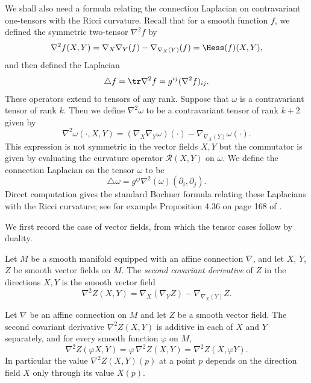 We shall also need a formula relating the connection Laplacian on
contravariant one-tensors with the Ricci curvature. Recall that for
a smooth function $f$, we defined the symmetric two-tensor
$\nabla^2f$ by
$$\nabla^2f(X,Y)=\nabla_X\nabla_Y(f)-\nabla_{\nabla_X(Y)}(f)=\Hess(f)(X,Y),$$
and then defined the Laplacian
$$\triangle f=\tr\nabla^2f=g^{ij}(\nabla^2f)_{ij}.$$ These operators extend to tensors of any
rank. Suppose that $\omega$ is a contravariant tensor of rank $k$. Then we
define $\nabla^2\omega$ to be a contravariant tensor of rank $k+2$ given by
$$\nabla^2\omega(\cdot,X,Y)=(\nabla_{X}\nabla_{Y}\omega)(\cdot)
-\nabla_{\nabla_X(Y)}\omega(\cdot).$$ This expression is not
symmetric in the vector fields $X,Y$ but the commutator is given by
evaluating the curvature operator ${\mathcal R}(X,Y)$ on $\omega$.
We define the connection Laplacian on the tensor $\omega$ to be
$$\triangle \omega=g^{ij}\nabla^2(\omega)(\partial_i,\partial_j).$$
Direct computation gives the standard Bochner formula relating these
Laplacians with the Ricci curvature; see for example Proposition
4.36 on page 168 of \cite{Gallot}.

We first record the case of vector fields, from which the tensor
cases follow by duality.

\begin{definition}
\label{def:second-covariant-derivative-vector-field}
\leanok
Let $M$ be a smooth manifold equipped with an affine connection
$\nabla$, and let $X$, $Y$, $Z$ be smooth vector fields on $M$. The
{\it second covariant derivative} of $Z$ in the directions $X,Y$ is
the smooth vector field
$$\nabla^2Z(X,Y)=\nabla_X\left(\nabla_YZ\right)-\nabla_{\nabla_X(Y)}Z.$$
\end{definition}

\begin{lemma}
\label{lem:second-covariant-derivative-tensorial}
\leanok
Let $\nabla$ be an affine connection on $M$ and let $Z$ be a smooth
vector field. The second covariant derivative $\nabla^2Z(X,Y)$ is
additive in each of $X$ and $Y$ separately, and for every smooth
function $\varphi$ on $M$,
$$\nabla^2Z(\varphi X,Y)=\varphi\,\nabla^2Z(X,Y)
=\nabla^2Z(X,\varphi Y).$$
In particular the value $\nabla^2Z(X,Y)(p)$ at a point $p$ depends
on the direction field $X$ only through its value $X(p)$.
\end{lemma}

